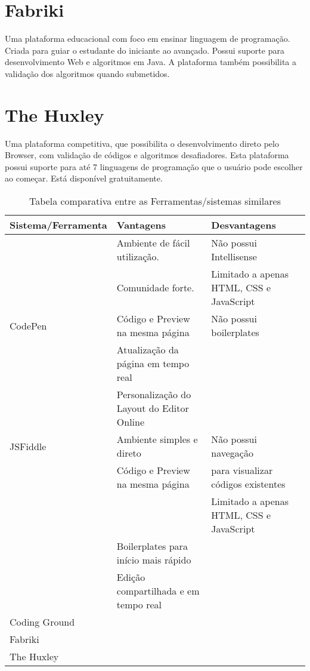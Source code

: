 \section{Fabriki}
\label{sec:fabriki}
Uma plataforma educacional com foco em ensinar linguagem de programação. Criada para guiar o estudante do iniciante ao avançado. Possui suporte para desenvolvimento Web e algoritmos em Java. A plataforma também possibilita a validação dos algoritmos quando submetidos.

\section{The Huxley}
\label{sec:thehuxley}
Uma plataforma competitiva, que possibilita o desenvolvimento direto pelo Browser, com validação de códigos e algoritmos desafiadores. Esta plataforma possui suporte para  até 7 linguagens de programação que o usuário pode escolher ao começar. Está disponível gratuitamente.


\begin{table}[htb]
	\caption{Tabela comparativa entre as Ferramentas/sistemas similares}
	\label{tb:sistemas-similares}
	\centering
	\begin{tabular}{|l|l|l|} %
		\hline
        Sistema/Ferramenta & Vantagens & Desvantagens \\
		\hline		%
		 			& Ambiente de fácil utilização. & Não possui Intellisense \\ 
					& Comunidade forte. & Limitado a apenas HTML, CSS e JavaScript \\
		CodePen		& Código e Preview na mesma página & Não possui boilerplates \\
					& Atualização da página em tempo real & \\
					& Personalização do Layout do Editor Online & \\
		\hline
		JSFiddle 	& Ambiente simples e direto & Não possui navegação \\
				    & Código e Preview na mesma página &  para visualizar códigos existentes \\
				    &                          & Limitado a apenas HTML, CSS e JavaScript \\
				    & Boilerplates para início mais rápido & \\
				    & Edição compartilhada e em tempo real & \\
		\hline
		Coding Ground		&           &              \\
		\hline
		Fabriki 			&           &              \\
		\hline
		The Huxley 			&           &              \\
		\hline
	\end{tabular}
\end{table}


